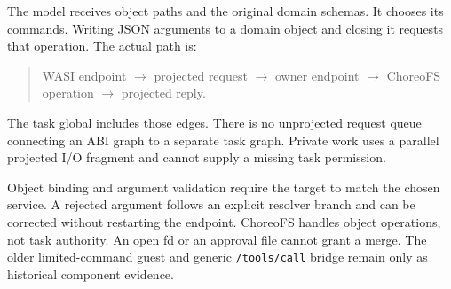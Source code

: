 \documentclass[10pt]{article}
\begin{document}
The model receives object paths and the original domain schemas. It chooses
its commands. Writing JSON arguments to a domain object and closing it requests
that operation. The actual path is:
\begin{quote}
WASI endpoint $\rightarrow$ projected request $\rightarrow$ owner endpoint
$\rightarrow$ ChoreoFS operation $\rightarrow$ projected reply.
\end{quote}
The task global includes those edges. There is no unprojected request queue
connecting an ABI graph to a separate task graph. Private work uses a parallel
projected I/O fragment and cannot supply a missing task permission.

Object binding and argument validation require the target to match the chosen
service. A rejected argument follows an explicit resolver branch and can be
corrected without restarting the endpoint. ChoreoFS handles object operations,
not task authority. An open fd or an approval file cannot grant a merge.
The older limited-command guest and generic \texttt{/tools/call} bridge remain
only as historical component evidence.
\end{document}
